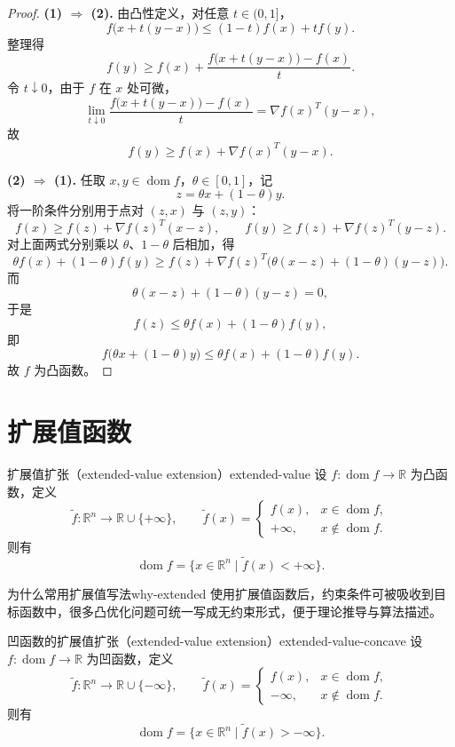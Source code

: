 \documentclass[11pt,a4paper]{article}
\begin{document}
\begin{proof}
\textbf{(1) $\Rightarrow$ (2).}
由凸性定义，对任意 $t\in(0,1]$，
\[
f\bigl(x+t(y-x)\bigr)\le (1-t)f(x)+tf(y).
\]
整理得
\[
f(y)\ge f(x)+\frac{f\bigl(x+t(y-x)\bigr)-f(x)}{t}.
\]
令 $t\downarrow 0$，由于 $f$ 在 $x$ 处可微，
\[
\lim_{t\downarrow 0}\frac{f\bigl(x+t(y-x)\bigr)-f(x)}{t}
=\nabla f(x)^T(y-x),
\]
故
\[
f(y)\ge f(x)+\nabla f(x)^T(y-x).
\]

\textbf{(2) $\Rightarrow$ (1).}
任取 $x,y\in\operatorname{dom}f$，$\theta\in[0,1]$，记
\[
z=\theta x+(1-\theta)y.
\]
将一阶条件分别用于点对 $(z,x)$ 与 $(z,y)$：
\[
f(x)\ge f(z)+\nabla f(z)^T(x-z),\qquad
f(y)\ge f(z)+\nabla f(z)^T(y-z).
\]
对上面两式分别乘以 $\theta$、$1-\theta$ 后相加，得
\[
\theta f(x)+(1-\theta)f(y)
\ge
f(z)+\nabla f(z)^T\!\bigl(\theta(x-z)+(1-\theta)(y-z)\bigr).
\]
而
\[
\theta(x-z)+(1-\theta)(y-z)=0,
\]
于是
\[
f(z)\le \theta f(x)+(1-\theta)f(y),
\]
即
\[
f\!\bigl(\theta x+(1-\theta)y\bigr)
\le
\theta f(x)+(1-\theta)f(y).
\]
故 $f$ 为凸函数。
\end{proof}

\section{扩展值函数}\label{sec:ch3-extension}

\begin{definition}{扩展值扩张（extended-value extension）}{extended-value}
设 $f:\operatorname{dom}f\to\mathbb{R}$ 为凸函数，定义
\[
\tilde f:\mathbb{R}^n\to\mathbb{R}\cup\{+\infty\},\qquad
\tilde f(x)=
\begin{cases}
f(x), & x\in\operatorname{dom}f,\\
+\infty, & x\notin\operatorname{dom}f.
\end{cases}
\]
则有
\[
\operatorname{dom}f=\{x\in\mathbb{R}^n\mid \tilde f(x)<+\infty\}.
\]
\end{definition}

\begin{remark}{为什么常用扩展值写法}{why-extended}
使用扩展值函数后，约束条件可被吸收到目标函数中，很多凸优化问题可统一写成无约束形式，便于理论推导与算法描述。
\end{remark}

\begin{definition}{凹函数的扩展值扩张（extended-value extension）}{extended-value-concave}
设 $f:\operatorname{dom}f\to\mathbb{R}$ 为凹函数，定义
\[
\tilde f:\mathbb{R}^n\to\mathbb{R}\cup\{-\infty\},\qquad
\tilde f(x)=
\begin{cases}
f(x), & x\in\operatorname{dom}f,\\
-\infty, & x\notin\operatorname{dom}f.
\end{cases}
\]
则有
\[
\operatorname{dom}f=\{x\in\mathbb{R}^n\mid \tilde f(x)>-\infty\}.
\]
\end{definition}
\end{document}
